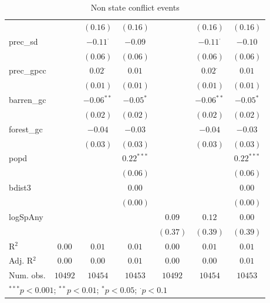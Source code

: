 \begin{sidewaystable}
\begin{center}
{\begin{tabular}{l c c c c c c}
                &               & $(0.16)$        & $(0.16)$     &               & $(0.16)$        & $(0.16)$     \\
prec\_sd        &               & $-0.11^{\cdot}$ & $-0.09$      &               & $-0.11^{\cdot}$ & $-0.10$      \\
                &               & $(0.06)$        & $(0.06)$     &               & $(0.06)$        & $(0.06)$     \\
prec\_gpcc      &               & $0.02^{\cdot}$  & $0.01$       &               & $0.02^{\cdot}$  & $0.01$       \\
                &               & $(0.01)$        & $(0.01)$     &               & $(0.01)$        & $(0.01)$     \\
barren\_gc      &               & $-0.06^{**}$    & $-0.05^{*}$  &               & $-0.06^{**}$    & $-0.05^{*}$  \\
                &               & $(0.02)$        & $(0.02)$     &               & $(0.02)$        & $(0.02)$     \\
forest\_gc      &               & $-0.04$         & $-0.03$      &               & $-0.04$         & $-0.03$      \\
                &               & $(0.03)$        & $(0.03)$     &               & $(0.03)$        & $(0.03)$     \\
popd            &               &                 & $0.22^{***}$ &               &                 & $0.22^{***}$ \\
                &               &                 & $(0.06)$     &               &                 & $(0.06)$     \\
bdist3          &               &                 & $0.00$       &               &                 & $0.00$       \\
                &               &                 & $(0.00)$     &               &                 & $(0.00)$     \\
logSpAny        &               &                 &              & $0.09$        & $0.12$          & $0.00$       \\
                &               &                 &              & $(0.37)$      & $(0.39)$        & $(0.39)$     \\
\hline
R$^2$           & $0.00$        & $0.01$          & $0.01$       & $0.00$        & $0.01$          & $0.01$       \\
Adj. R$^2$      & $0.00$        & $0.00$          & $0.01$       & $0.00$        & $0.00$          & $0.01$       \\
Num. obs.       & $10492$       & $10454$         & $10453$      & $10492$       & $10454$         & $10453$      \\
\hline
\multicolumn{7}{l}{\scriptsize{$^{***}p<0.001$; $^{**}p<0.01$; $^{*}p<0.05$; $^{\cdot}p<0.1$}}
\end{tabular}
}
\caption{Non state conflict events}
\label{non_state}
\end{center}
\end{sidewaystable}
